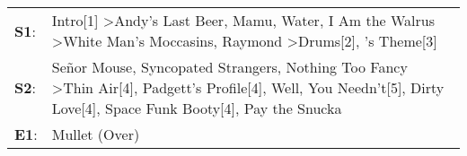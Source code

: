 \begin{supertabular}{p{0.03\textwidth}p{0.92\textwidth}}
 \textbf{S1}:  &                          Intro[1]\textsuperscript{} \textgreater \enspace Andy's Last Beer\textsuperscript{}, \enspace Mamu\textsuperscript{}, \enspace Water\textsuperscript{}, \enspace I Am the Walrus\textsuperscript{} \textgreater \enspace White Man's Moccasins\textsuperscript{}, \enspace Raymond\textsuperscript{} \textgreater \enspace Drums[2]\textsuperscript{}, 's Theme[3]\textsuperscript{}  \enspace  \\
 \textbf{S2}:  &  Señor Mouse\textsuperscript{}, \enspace Syncopated Strangers\textsuperscript{}, \enspace Nothing Too Fancy\textsuperscript{} \textgreater \enspace Thin Air[4]\textsuperscript{}, \enspace Padgett's Profile[4]\textsuperscript{}, \enspace Well, You Needn't[5]\textsuperscript{}, \enspace Dirty Love[4]\textsuperscript{}, \enspace Space Funk Booty[4]\textsuperscript{}, \enspace Pay the Snucka\textsuperscript{}  \enspace  \\
 \textbf{E1}:  &                                                                                                                                                                                                                                                                                                                                                                                          Mullet (Over)\textsuperscript{}  \enspace  \\
\end{supertabular}
